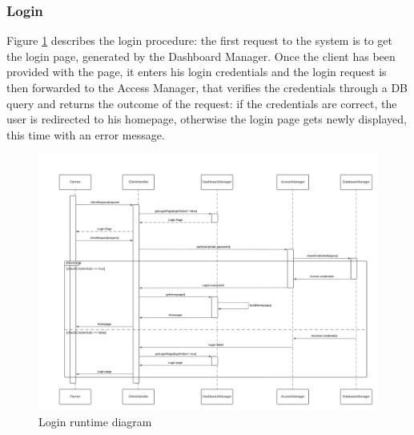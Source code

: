 \documentclass[10pt]{article} %
\begin{document}
\subsubsection{Login}
Figure \ref{fig:r_login} describes the login procedure: the first request to the system is to get the login page, generated by the Dashboard Manager. Once the client has been provided
with the page, it enters his login credentials and the login request is then forwarded to the Access Manager, that verifies the credentials through a DB query and returns the outcome of the request:
if the credentials are correct, the user is redirected to his homepage, otherwise the login page gets newly displayed, this time with an error message.
\begin{figure}[h]
    \centering
    \centerline{\includegraphics[scale=0.49]{images/rv/login.png}}
    \caption{Login runtime diagram}
    \label{fig:r_login}
\end{figure}
\end{document}
